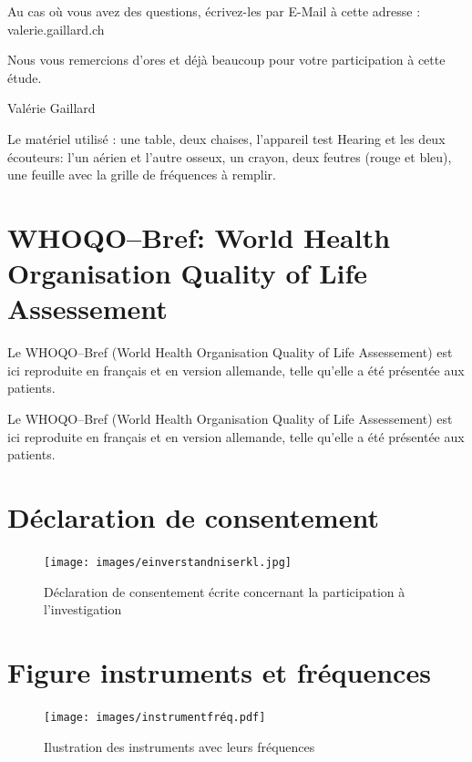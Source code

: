 Au cas où vous avez des questions, écrivez-les par E-Mail à cette adresse : valerie.gaillard\@gmx.ch

Nous vous remercions d'ores et déjà beaucoup pour votre participation
à cette étude.

Valérie Gaillard


\begin{french}
	Le matériel utilisé : une table, deux chaises, l'appareil
	test Hearing et les deux écouteurs: l'un aérien et l'autre osseux, un crayon, deux
	feutres (rouge et bleu), une feuille avec la grille de fréquences à
	remplir.
\end{french}

\section{WHOQO--Bref: World Health
   Organisation Quality of Life Assessement}

Le WHOQO--Bref (World Health
   Organisation Quality of Life Assessement) est ici reproduite en
   français et en
   version allemande, telle qu'elle a été présentée aux patients.


Le WHOQO--Bref (World Health
   Organisation Quality of Life Assessement) est ici reproduite en
   français et en
   version allemande, telle qu'elle a été présentée aux patients.

\section{Déclaration de consentement}

\begin{figure}
	\centering
	\texttt{[image: images/einverstandniserkl.jpg]}
	\caption{Déclaration de consentement écrite concernant la
          participation à l'investigation}
	\label{fig:déclaration de consentement}
\end{figure}

%
%
%
%
%

\section{Figure instruments et fréquences}
\label{instrumentfrequence}


   \begin{figure}
	\centering
	\texttt{[image: images/instrumentfréq.pdf]}
	\caption[Les instruments et leurs fréquences]{Ilustration des instruments avec leurs fréquences}
       
	\label{instrumentfreq}
\end{figure}
  
 